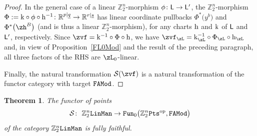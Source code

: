 \documentclass[pdftex]{sigma}%
\newcommand{\op}[1]{\operatorname{#1}}
\newcommand{\R}{{\mathbb R}}
\newcommand{\Z}{{\mathbb Z}}
\def\ul{\underline}
\def\ul{\underline}
\newcommand{\0}{\otimes}
\newcommand{\z}{\Z_2^n}
\numberwithin{equation}{section}
\newtheorem{Theorem}{Theorem}[section]
\begin{document}
\begin{proof}
In the general case of a linear $\z$-morphism $\phi\colon {\sf L}\to{\sf L}'$, the $\z$-morphism $\Phi:={\rm k}\circ\phi\circ{\rm h}^{-1}\colon \R^{p|\ul q}\to\R^{r|\ul s}$ has linear coordinate pullbacks $\Phi^*\big(y^b\big)$ and $\Phi^*\big(\zh^B\big)$ (and is thus a linear $\z$-morphism), for any charts $\rm h$ and $\rm k$ of $\sf L$ and ${\sf L}'$, respectively. Since $\zvf={\rm k}^{-1}\circ\Phi\circ{\rm h}$, we have $\zvf_\zL={\rm k}_\zL^{-1}\circ\Phi_\zL\circ{\rm h}_\zL$ and, in view of Proposition~\ref{FL0Mod} and the result of the preceding paragraph, all three factors of the {\small RHS} are $\zL_0$-linear.

Finally, the natural transformation $\mathcal{S}(\zvf)$ is a natural transformation of the functor category with target $\tt FAMod$.\end{proof}

\begin{Theorem}\label{FunPtsLinManFF}
The functor of points
\[
\mathcal{S}\colon\ \z{\tt LinMan}\to{\tt Fun}_0\big(\z{\tt Pts}^{\op{op}},\tt FAMod\big)
\]
of the category $\z\tt LinMan$ is fully faithful.
\end{Theorem}
\end{document}
